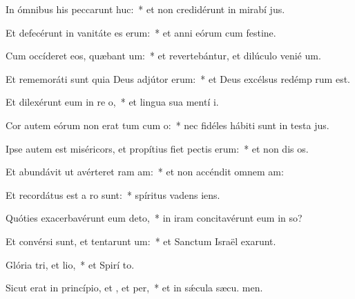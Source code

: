 \item In ómnibus his peccarunt huc:~* et non credidérunt in mirabí jus.
\item Et defecérunt in vanitáte es erum:~* et anni eórum cum festine.
\item Cum occíderet eos, quæbant um:~* et revertebántur, et dilúculo venié  um.
\item Et rememoráti sunt quia Deus adjútor  erum:~* et Deus excélsus redémp rum est.
\item Et dilexérunt eum in re o,~* et lingua sua mentí  i.
\item Cor autem eórum non erat tum cum o:~* nec fidéles hábiti sunt in testa jus.
\item Ipse autem est miséricors, et propítius fiet pectis erum:~* et non dis os.
\item Et abundávit ut avérteret ram am:~* et non accéndit omnem  am:
\item Et recordátus est a ro sunt:~* spíritus vadens   iens.
\item Quóties exacerbavérunt eum  deto,~* in iram concitavérunt eum in so?
\item Et convérsi sunt, et tentarunt um:~* et Sanctum Israël exarunt.
\item Glória tri, et lio,~* et Spirí to.
\item Sicut erat in princípio, et , et per,~* et in sǽcula sæcu. men.
